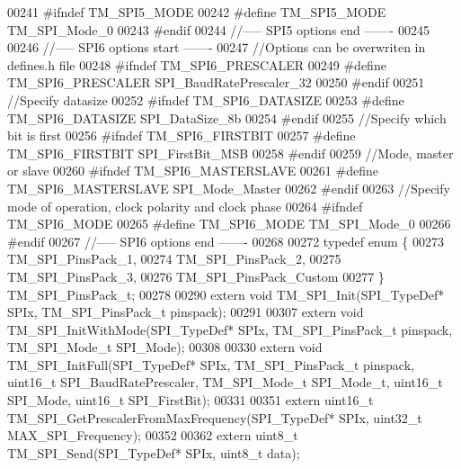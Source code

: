 \begin{DoxyCode}
00241 \textcolor{preprocessor}{#ifndef TM\_SPI5\_MODE}
00242 \textcolor{preprocessor}{#define TM\_SPI5\_MODE        TM\_SPI\_Mode\_0}
00243 \textcolor{preprocessor}{#endif}
00244 \textcolor{comment}{//----- SPI5 options end -------}
00245 
00246 \textcolor{comment}{//----- SPI6 options start -------}
00247 \textcolor{comment}{//Options can be overwriten in defines.h file}
00248 \textcolor{preprocessor}{#ifndef TM\_SPI6\_PRESCALER}
00249 \textcolor{preprocessor}{#define TM\_SPI6\_PRESCALER   SPI\_BaudRatePrescaler\_32}
00250 \textcolor{preprocessor}{#endif}
00251 \textcolor{comment}{//Specify datasize}
00252 \textcolor{preprocessor}{#ifndef TM\_SPI6\_DATASIZE}
00253 \textcolor{preprocessor}{#define TM\_SPI6\_DATASIZE    SPI\_DataSize\_8b}
00254 \textcolor{preprocessor}{#endif}
00255 \textcolor{comment}{//Specify which bit is first}
00256 \textcolor{preprocessor}{#ifndef TM\_SPI6\_FIRSTBIT}
00257 \textcolor{preprocessor}{#define TM\_SPI6\_FIRSTBIT    SPI\_FirstBit\_MSB}
00258 \textcolor{preprocessor}{#endif}
00259 \textcolor{comment}{//Mode, master or slave}
00260 \textcolor{preprocessor}{#ifndef TM\_SPI6\_MASTERSLAVE}
00261 \textcolor{preprocessor}{#define TM\_SPI6\_MASTERSLAVE SPI\_Mode\_Master}
00262 \textcolor{preprocessor}{#endif}
00263 \textcolor{comment}{//Specify mode of operation, clock polarity and clock phase}
00264 \textcolor{preprocessor}{#ifndef TM\_SPI6\_MODE}
00265 \textcolor{preprocessor}{#define TM\_SPI6\_MODE        TM\_SPI\_Mode\_0}
00266 \textcolor{preprocessor}{#endif}
00267 \textcolor{comment}{//----- SPI6 options end -------}
00268 
00272 \textcolor{keyword}{typedef} \textcolor{keyword}{enum} \{
00273     TM\_SPI\_PinsPack\_1,
00274     TM\_SPI\_PinsPack\_2,
00275     TM\_SPI\_PinsPack\_3,
00276     TM\_SPI\_PinsPack\_Custom
00277 \} TM\_SPI\_PinsPack\_t;
00278 
00290 \textcolor{keyword}{extern} \textcolor{keywordtype}{void} TM\_SPI\_Init(SPI\_TypeDef* SPIx, TM\_SPI\_PinsPack\_t pinspack);
00291 
00307 \textcolor{keyword}{extern} \textcolor{keywordtype}{void} TM\_SPI\_InitWithMode(SPI\_TypeDef* SPIx, TM\_SPI\_PinsPack\_t pinspack, TM\_SPI\_Mode\_t SPI\_Mode);
00308 
00330 \textcolor{keyword}{extern} \textcolor{keywordtype}{void} TM\_SPI\_InitFull(SPI\_TypeDef* SPIx, TM\_SPI\_PinsPack\_t pinspack, uint16\_t SPI\_BaudRatePrescaler, 
      TM\_SPI\_Mode\_t SPI\_Mode\_t, uint16\_t SPI\_Mode, uint16\_t SPI\_FirstBit);
00331 
00351 \textcolor{keyword}{extern} uint16\_t TM\_SPI\_GetPrescalerFromMaxFrequency(SPI\_TypeDef* SPIx, uint32\_t MAX\_SPI\_Frequency);
00352 
00362 \textcolor{keyword}{extern} uint8\_t TM\_SPI\_Send(SPI\_TypeDef* SPIx, uint8\_t data);

\end{DoxyCode}
